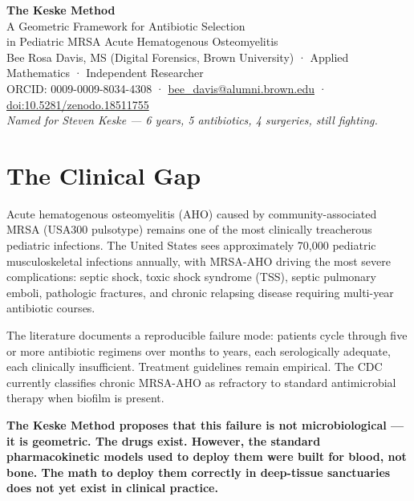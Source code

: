 \documentclass[11pt]{article}
\begin{document}
\begin{center}
  {\LARGE\bfseries The Keske Method}\\[6pt]
  {\large A Geometric Framework for Antibiotic Selection\\
  in Pediatric MRSA Acute Hematogenous Osteomyelitis}\\[10pt]
  {\color{muted}\small
  Bee Rosa Davis, MS (Digital Forensics, Brown University) · Applied Mathematics · 
  Independent Researcher \\
  ORCID: 0009-0009-8034-4308 · \href{mailto:bee_davis@alumni.brown.edu}{bee\_davis@alumni.brown.edu} ·
  \href{https://doi.org/10.5281/zenodo.18511755}{doi:10.5281/zenodo.18511755}}\\[4pt]
  {\color{dkred}\small\itshape
  Named for Steven Keske — 6 years, 5 antibiotics, 4 surgeries, still fighting.}
\end{center}

\vspace{6pt}

\section{The Clinical Gap}

Acute hematogenous osteomyelitis (AHO) caused by community-associated MRSA
(USA300 pulsotype) remains one of the most clinically treacherous pediatric
infections. The United States sees approximately 70,000 pediatric musculoskeletal
infections annually, with MRSA-AHO driving the most severe complications:
septic shock, toxic shock syndrome (TSS), septic pulmonary emboli, pathologic
fractures, and chronic relapsing disease requiring multi-year antibiotic courses.

The literature documents a reproducible failure mode: patients cycle through
five or more antibiotic regimens over months to years, each serologically
adequate, each clinically insufficient. Treatment guidelines remain empirical.
The CDC currently classifies chronic MRSA-AHO as refractory to standard
antimicrobial therapy when biofilm is present.

\textbf{The Keske Method proposes that this failure is not microbiological — it is
geometric. The drugs exist. However, the standard pharmacokinetic models
used to deploy them were built for blood, not bone. The math to deploy them
correctly in deep-tissue sanctuaries does not yet exist in clinical practice.}
\end{document}
